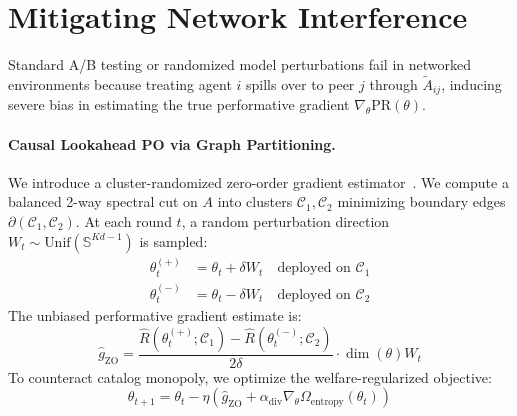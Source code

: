 \documentclass[10pt,twocolumn]{article}
\begin{document}
\section{Mitigating Network Interference}

Standard A/B testing or randomized model perturbations fail in networked environments because treating agent $i$ spills over to peer $j$ through $\tilde{A}_{ij}$, inducing severe bias in estimating the true performative gradient $\nabla_\theta \text{PR}(\theta)$.

\paragraph{Causal Lookahead PO via Graph Partitioning.}
We introduce a cluster-randomized zero-order gradient estimator~\cite{ugander2013graph, flaxman2005online}. We compute a balanced 2-way spectral cut on $A$ into clusters $\mathcal{C}_1, \mathcal{C}_2$ minimizing boundary edges $\partial(\mathcal{C}_1, \mathcal{C}_2)$. At each round $t$, a random perturbation direction $W_t \sim \text{Unif}(\mathbb{S}^{Kd-1})$ is sampled:
\begin{align}
\theta_t^{(+)} &= \theta_t + \delta W_t \quad \text{deployed on } \mathcal{C}_1 \\
\theta_t^{(-)} &= \theta_t - \delta W_t \quad \text{deployed on } \mathcal{C}_2
\end{align}
The unbiased performative gradient estimate is:
\begin{equation}
\hat{g}_{\text{ZO}} = \frac{\hat{R}(\theta_t^{(+)}; \mathcal{C}_1) - \hat{R}(\theta_t^{(-)}; \mathcal{C}_2)}{2\delta} \cdot \operatorname{dim}(\theta) W_t
\end{equation}
To counteract catalog monopoly, we optimize the welfare-regularized objective:
\begin{equation}
\theta_{t+1} = \theta_t - \eta \left( \hat{g}_{\text{ZO}} + \alpha_{\text{div}} \nabla_\theta \Omega_{\text{entropy}}(\theta_t) \right)
\end{equation}

\begin{table}[t]
\centering
\caption{\small Empirical evaluation of algorithms at $t=20$ ($\epsilon=0.2, \kappa=0.4, \lambda=0.4$). Evaluated on parameter drift, Sarle's bimodality coefficient, and social welfare.}
\label{tab:algos}
\small
{}
\end{table}
\end{document}
